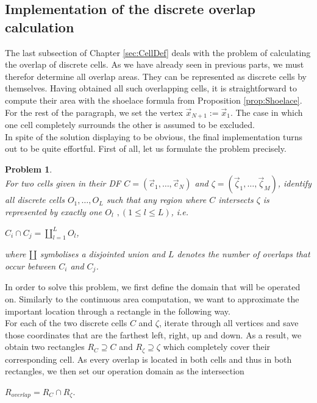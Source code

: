 \documentclass[a4paper,12pt,leqno]{article}
\theoremstyle{plain}
\newtheorem{problem}[theorem]{Problem}
\theoremstyle{remark}
\begin{document}
\subsection{Implementation of the discrete overlap calculation} \label{sec:ImplementationDiscreteOverlap}
The last subsection of Chapter \ref{sec:CellDef} deals with the problem of calculating the overlap of discrete cells. As we have already seen in previous parts, we must therefor determine all overlap areas. They can be represented as discrete cells by themselves. Having obtained all such overlapping cells, it is straightforward to compute their area with the shoelace formula from Proposition \ref{prop:Shoelace}. \\
For the rest of the paragraph, we set the vertex $\vec{x}_{N+1} := \vec{x}_1$. The case in which one cell completely surrounds the other is assumed to be excluded. \\
In spite of the solution displaying to be obvious, the final implementation turns out to be quite effortful. First of all, let us formulate the problem precisely.\\
\begin{problem} \textbf{} \label{problem:overlap}\\ 
	For two cells given in their DF $C = (\vec{c}_1, \ldots, \vec{c}_N)$ and $\zeta = (\vec{\zeta}_1, \ldots, \vec{\zeta}_M)$, identify all discrete cells $O_1, \ldots, O_L$ such that any region where $C$ intersects $\zeta$ is represented by exactly one $O_l$ $, (1 \leq l \leq L)$, i.e.
	\begin{center}
		$
		C_i \cap C_j = \amalg_{l=1}^{L} O_l
		$,
	\end{center}
	where $\amalg$ symbolises a disjointed union and $L$ denotes the number of overlaps that occur between $C_i$ and $C_j$.
\end{problem}
In order to solve this problem, we first define the domain that will be operated on. Similarly to the continuous area computation, we want to approximate the important location through a rectangle in the following way.\\ 
For each of the two discrete cells $C$ and $\zeta$, iterate through all vertices and save those coordinates that are the farthest left, right, up and down. As a result, we obtain two rectangles $R_C \supseteq C$ and $R_\zeta \supseteq \zeta$ which completely cover their corresponding cell. As every overlap is located in both cells and thus in both rectangles, we then set our operation domain as the intersection 
\begin{center}
	$R_{overlap} = R_C \cap R_\zeta$. 
\end{center}
\end{document}

